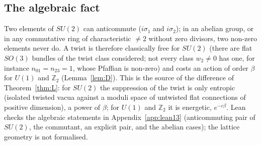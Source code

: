 \documentclass[11pt,a4paper]{article}
\theoremstyle{plain}
\theoremstyle{definition}
\theoremstyle{remark}
\numberwithin{equation}{section}
\newcommand{\Z}{\mathbb{Z}}
\begin{document}
\subsection{The algebraic fact}
Two elements of $SU(2)$ can anticommute ($i\sigma_1$ and $i\sigma_2$); in an abelian group, or in any commutative ring of characteristic $\ne2$ without zero divisors, two non-zero elements never do. A twist is therefore classically free for $SU(2)$ (there are flat $SO(3)$ bundles of the twist class considered; not every class $w_2\ne0$ has one, for instance $n_{01}=n_{23}=1$, whose Pfaffian is non-zero) and costs an action of order $\beta$ for $U(1)$ and $\Z_2$ (Lemma~\ref{lem:D}). This is the source of the difference of Theorem~\ref{thm:L}: for $SU(2)$ the suppression of the twist is only entropic (isolated twisted vacua against a moduli space of untwisted flat connections of positive dimension), a power of $\beta$; for $U(1)$ and $\Z_2$ it is energetic, $e^{-c\beta}$. Lean checks the algebraic statements in Appendix~\ref{app:lean13} (anticommuting pair of $SU(2)$, the commutant, an explicit pair, and the abelian cases); the lattice geometry is not formalised.
\end{document}
